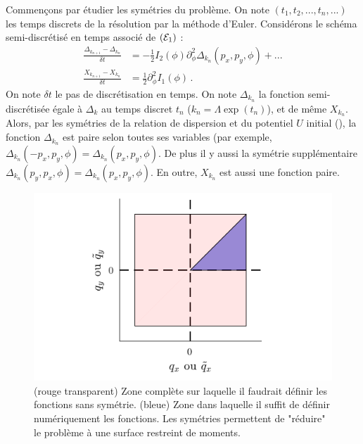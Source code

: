 \documentclass[10.5pt]{article}
\begin{document}
\begin{multicols}{2}
Commençons par étudier les symétries du problème. On note $(t_1, t_2, ..., t_n, ...)$ les temps discrets de la résolution par la méthode d'Euler. Considérons le schéma semi-discrétisé en temps associé de $(\mathcal{E}_1)$  :
\begin{equation}
	\begin{split}
	\frac{\Delta_{k_{n+1}} - \Delta_{k_{n}}}{\delta t}	& =  - \frac{1}{2} I_2(\phi) \partial_{\phi}^2 \Delta_{k_n}(p_x, p_y, \phi)  +  ... \\
	\frac{X_{k_{n+1}} - X_{k_{n}}}{\delta t} & = \frac{1}{2} \partial_{\phi}^2 I_1(\phi) \, .
	\end{split}
\end{equation}
On note $\delta t$ le pas de discrétisation en temps. On note $\Delta_{k_n}$ la fonction semi-discrétisée égale à $\Delta_k$ au temps discret $t_n$ ($k_n = \Lambda\exp(t_n)$), et de même $X_{k_n}$. Alors, par les symétries de la relation de dispersion et du potentiel $U$ initial (), la fonction $\Delta_{k_n}$ est paire selon toutes ses variables (par exemple, $\Delta_{k_n}(-p_x, p_y, \phi) = \Delta_{k_n}(p_x, p_y, \phi)$. De plus il y aussi la symétrie supplémentaire $\Delta_{k_n}(p_y, p_x, \phi) = \Delta_{k_n} (p_x, p_y, \phi)$. En outre, $X_{k_n}$ est aussi une fonction paire. 

\begin{figure}[H]
\begin{center}
	\includegraphics[width=0.95\columnwidth]{SurfUtile.pdf}
\end{center}
\vspace*{-22pt}
\caption{(rouge transparent) Zone complète sur laquelle il faudrait définir les fonctions sans symétrie. (bleue) Zone dans laquelle il suffit de définir numériquement les fonctions. Les symétries permettent de "réduire" le problème à une surface restreint de moments.}
\label{fig:SurfUtile}
\end{figure}



\end{multicols}
\end{document}
